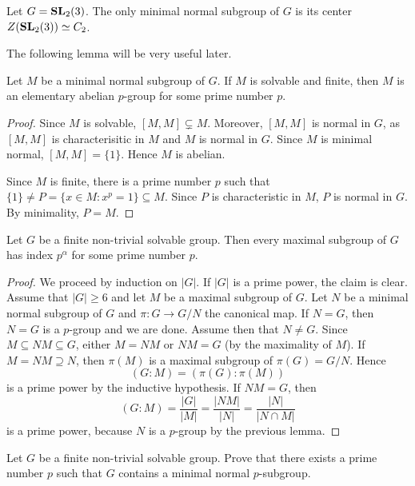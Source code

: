 \begin{example}
    Let $G=\mathbf{SL}_2(3)$. The only minimal normal subgroup of $G$ is its center
    $Z(\mathbf{SL}_2(3))\simeq C_2$.
\end{example}


The following lemma will be very useful later. 

\begin{lemma}
\label{lem:minimal_normal}
Let $M$ be a minimal normal subgroup of $G$. If $M$ is solvable and finite, 
then $M$ is an elementary abelian $p$-group for some prime number $p$. 
\end{lemma}

\begin{proof}
Since $M$ is solvable, $[M,M]\subsetneq M$. Moreover, $[M,M]$ is normal in $G$, as
$[M,M]$ is characterisitic in $M$ and $M$ is normal in $G$. Since $M$ is minimal normal, 
$[M,M]=\{1\}$. Hence $M$ is abelian. 
	
Since $M$ is finite, there is a prime number $p$ such that $\{1\}\ne P=\{x\in
M:x^p=1\}\subseteq M$.  Since $P$ is characteristic in $M$, $P$ is normal in 
$G$. By minimality, $P=M$.
\end{proof}

\begin{theorem}
	Let $G$ be a finite non-trivial solvable group. Then 
		every maximal subgroup of $G$ has index $p^\alpha$ for some prime number $p$. 
\end{theorem}

\begin{proof}
	We proceed by induction on $|G|$.
	If $|G|$ is a prime power, the claim is clear. Assume that $|G|\geq6$ and let $M$ be a maximal subgroup of $G$. 
        Let $N$ be a minimal normal subgroup of $G$ and $\pi\colon G\to G/N$ the canonical map. 
	If $N=G$, then $N=G$ is a $p$-group and we are done. Assume then that 
	$N\ne G$. Since $M\subseteq NM\subseteq G$,
	either $M=NM$ or $NM=G$ (by the maximality of $M$).  If 
	$M=NM\supseteq N$, then $\pi(M)$ is a maximal subgroup of $\pi(G)=G/N$. Hence 
	\[
	(G:M)=(\pi(G):\pi(M))
	\]
	is a prime power by the inductive hypothesis. If 
	$NM=G$, then 
	\[
	(G:M)=\frac{|G|}{|M|}=\frac{|NM|}{|N|}=\frac{|N|}{|N\cap M|}
	\]
	is a prime power, because $N$ is a $p$-group by the previous lemma. 
\end{proof}

\begin{exercise}
    Let $G$ be a finite non-trivial solvable group. Prove that 
    there exists a prime number $p$ such that $G$ 
    contains a minimal normal $p$-subgroup. 
\end{exercise}

